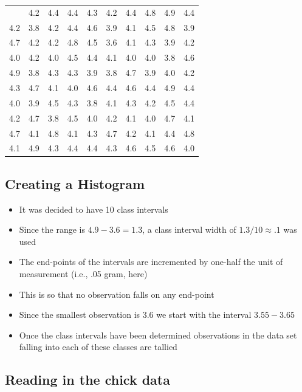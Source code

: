 \documentclass[
  letterpaper,
  DIV=11,
  numbers=noendperiod]{scrartcl}
\newcounter{none} %
\begin{document}
{\def\LTcaptype{none} %
\begin{longtable}[]{@{}rrrrrrrrrr@{}}
\toprule\noalign{}
\endhead
\bottomrule\noalign{}
\endlastfoot
3.7 & 4.2 & 4.4 & 4.4 & 4.3 & 4.2 & 4.4 & 4.8 & 4.9 & 4.4 \\
4.2 & 3.8 & 4.2 & 4.4 & 4.6 & 3.9 & 4.1 & 4.5 & 4.8 & 3.9 \\
4.7 & 4.2 & 4.2 & 4.8 & 4.5 & 3.6 & 4.1 & 4.3 & 3.9 & 4.2 \\
4.0 & 4.2 & 4.0 & 4.5 & 4.4 & 4.1 & 4.0 & 4.0 & 3.8 & 4.6 \\
4.9 & 3.8 & 4.3 & 4.3 & 3.9 & 3.8 & 4.7 & 3.9 & 4.0 & 4.2 \\
4.3 & 4.7 & 4.1 & 4.0 & 4.6 & 4.4 & 4.6 & 4.4 & 4.9 & 4.4 \\
4.0 & 3.9 & 4.5 & 4.3 & 3.8 & 4.1 & 4.3 & 4.2 & 4.5 & 4.4 \\
4.2 & 4.7 & 3.8 & 4.5 & 4.0 & 4.2 & 4.1 & 4.0 & 4.7 & 4.1 \\
4.7 & 4.1 & 4.8 & 4.1 & 4.3 & 4.7 & 4.2 & 4.1 & 4.4 & 4.8 \\
4.1 & 4.9 & 4.3 & 4.4 & 4.4 & 4.3 & 4.6 & 4.5 & 4.6 & 4.0 \\
\end{longtable}
}

\subsection{Creating a Histogram}\label{creating-a-histogram}

\begin{itemize}
\item
  It was decided to have 10 class intervals
\item
  Since the range is \(4.9-3.6=1.3\), a class interval width of
  \(1.3/10  \approx .1\) was used
\item
  The end-points of the intervals are incremented by one-half the unit
  of measurement (i.e., .05 gram, here)
\item
  This is so that no observation falls on any end-point
\item
  Since the smallest observation is 3.6 we start with the interval
  \(3.55-3.65\)
\item
  Once the class intervals have been determined observations in the data
  set falling into each of these classes are tallied
\end{itemize}

\subsection{Reading in the chick data}\label{reading-in-the-chick-data}
\end{document}
